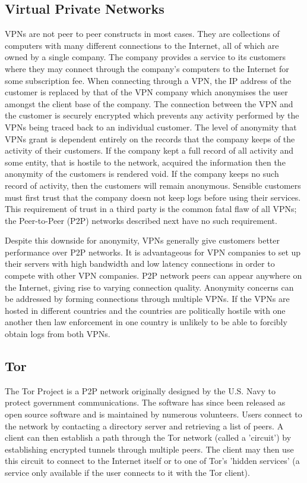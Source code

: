 \documentclass[ %
                    author={Luke Murray},
                supervisor={Dr. Simon Hollis},
                     title={Shadow Peer-to-Peer Networks},
                  subtitle={},
                    degree={MEng},
                      year={2013} ]{thesis}
\begin{document}
\subsection{Virtual Private Networks}

VPNs are not peer to peer constructs in most cases. They are collections of computers with many different connections to the Internet, all of which are owned by a single company. The company provides a service to its customers where they may connect through the company's computers to the Internet for some subscription fee. When connecting through a VPN, the IP address of the customer is replaced by that of the VPN company which anonymises the user amongst the client base of the company. The connection between the VPN and the customer is securely encrypted which prevents any activity performed by the VPNs being traced back to an individual customer. The level of anonymity that VPNs grant is dependent entirely on the records that the company keeps of the activity of their customers. If the company kept a full record of all activity and some entity, that is hostile to the network, acquired the information then the anonymity of the customers is rendered void. If the company keeps no such record of activity, then the customers will remain anonymous. Sensible customers must first trust that the company doesn not keep logs before using their services. This requirement of trust in a third party is the common fatal flaw of all VPNs; the Peer-to-Peer (P2P) networks described next have no such requirement.

Despite this downside for anonymity, VPNs generally give customers better performance over P2P networks. It is advantageous for VPN companies to set up their servers with high bandwidth and low latency connections in order to compete with other VPN companies. P2P network peers can appear anywhere on the Internet, giving rise to varying connection quality. Anonymity concerns can be addressed by forming connections through multiple VPNs. If the VPNs are hosted in different countries and the countries are politically hostile with one another then law enforcement in one country is unlikely to be able to forcibly obtain logs from both VPNs.

\subsection{Tor}

The Tor Project\cite{Tor} is a P2P network originally designed by the U.S. Navy to protect government communications. The software has since been released as open source software and is maintained by numerous volunteers. Users connect to the network by contacting a directory server and retrieving a list of peers. A client can then establish a path through the Tor network (called a 'circuit') by establishing encrypted tunnels through multiple peers. The client may then use this circuit to connect to the Internet itself or to one of Tor's 'hidden services' (a service only available if the user connects to it with the Tor client).
\end{document}

